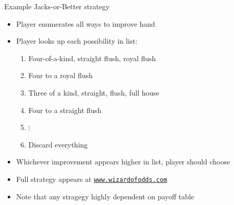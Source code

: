 \documentclass[handout,xcolor=dvipsnames]{beamer}
\theoremstyle{definition}
\begin{document}
\begin{frame}{Example Jacks-or-Better strategy}
\begin{itemize}
\item Player enumerates all ways to improve hand
\item Player looks up each possibility in list:
\begin{enumerate}
\item Four-of-a-kind, straight flush, royal flush
\item Four to a royal flush
\item Three of a kind, straight, flush, full house
\item Four to a straight flush
\item[]$\vdots$
\setcounter{enumi}{15}
\item Discard everything
\end{enumerate}
\item Whichever improvement appears higher in list,
player should choose
\item Full strategy appears at \href{http://wizardofodds.com/games/video-poker/strategy/jacks-or-better/9-6/simple}{\color{blue}\tt www.wizardofodds.com}
\item Note that any stragegy highly dependent
on payoff table
\end{itemize}
\end{frame}
\end{document}
